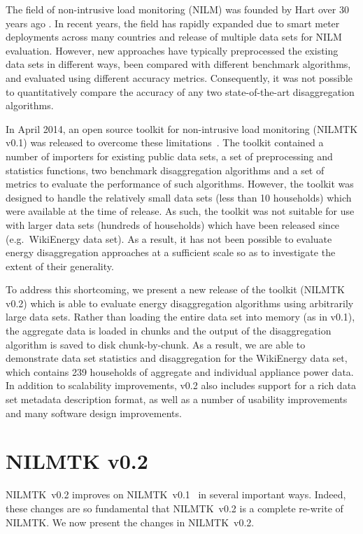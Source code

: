 \documentclass[10pt,abstract]{sensys-proc}
\begin{document}
The field of non-intrusive load monitoring (NILM) was founded by Hart over 30 years ago \cite{hart_1992}. In recent years, the field has rapidly expanded due to smart meter deployments across many countries and release of multiple data sets for NILM evaluation. However, new approaches have typically preprocessed the existing data sets in different ways, been compared with different benchmark algorithms, and evaluated using different accuracy metrics. Consequently, it was not possible to quantitatively compare the accuracy of any two state-of-the-art disaggregation algorithms.

In April 2014, an open source toolkit for non-intrusive load monitoring (NILMTK v0.1) was released to overcome these limitations~\cite{nilmtk}. The toolkit contained a number of importers for existing public data sets, a set of preprocessing and statistics functions, two benchmark disaggregation algorithms and a set of metrics to evaluate the performance of such algorithms. However, the toolkit was designed to handle the relatively small data sets (less than 10 households) which were available at the time of release. As such, the toolkit was not suitable for use with larger data sets (hundreds of households) which have been released since (e.g.\ WikiEnergy data set). As a result, it has not been possible to evaluate energy disaggregation approaches at a sufficient scale so as to investigate the extent of their generality.

To address this shortcoming, we present a new release of the toolkit (NILMTK v0.2) which is able to evaluate energy disaggregation algorithms using arbitrarily large data sets.  Rather than loading the entire data set into memory (as in v0.1), the aggregate data is loaded in chunks and the output of the disaggregation algorithm is saved to disk chunk-by-chunk. As a result, we are able to demonstrate data set statistics and disaggregation for the WikiEnergy data set, which contains 239 households of aggregate and individual appliance power data. In addition to scalability improvements, v0.2 also includes support for a rich data set metadata description format, as well as a number of usability improvements and many software design improvements.

\section{NILMTK v0.2}

NILMTK~v0.2 improves on NILMTK~v0.1~\cite{nilmtk} in several important ways.  Indeed, these changes are so fundamental that NILMTK~v0.2 is a complete re-write of NILMTK. We now present the changes in NILMTK~v0.2.
\end{document}
